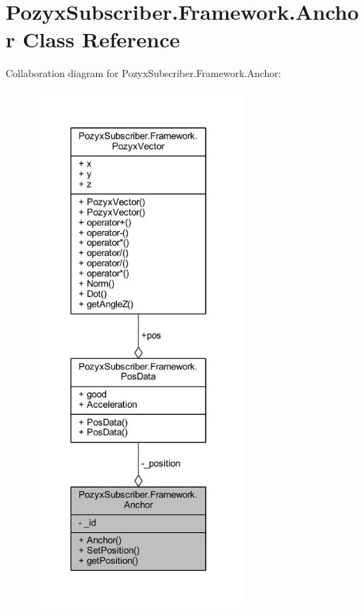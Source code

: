 \hypertarget{class_pozyx_subscriber_1_1_framework_1_1_anchor}{}\section{Pozyx\+Subscriber.\+Framework.\+Anchor Class Reference}
\label{class_pozyx_subscriber_1_1_framework_1_1_anchor}


Collaboration diagram for Pozyx\+Subscriber.\+Framework.\+Anchor\+:
\nopagebreak
\begin{figure}[H]
\begin{center}
\leavevmode
\includegraphics[height=550pt]{class_pozyx_subscriber_1_1_framework_1_1_anchor__coll__graph}
\end{center}
\end{figure}
